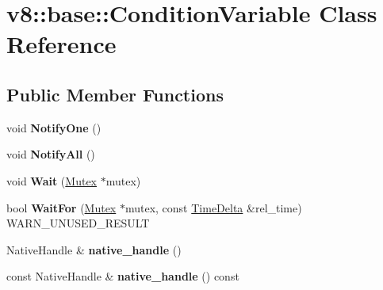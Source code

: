 \hypertarget{classv8_1_1base_1_1_condition_variable}{}\section{v8\+:\+:base\+:\+:Condition\+Variable Class Reference}
\label{classv8_1_1base_1_1_condition_variable}
\subsection*{Public Member Functions}
\begin{DoxyCompactItemize}
\item 
void {\bfseries Notify\+One} ()\hypertarget{classv8_1_1base_1_1_condition_variable_ab95e3ebf6594803215e1fea18848eb97}{}\label{classv8_1_1base_1_1_condition_variable_ab95e3ebf6594803215e1fea18848eb97}

\item 
void {\bfseries Notify\+All} ()\hypertarget{classv8_1_1base_1_1_condition_variable_a28caf62e21af81a016735dd9f11010d0}{}\label{classv8_1_1base_1_1_condition_variable_a28caf62e21af81a016735dd9f11010d0}

\item 
void {\bfseries Wait} (\hyperlink{classv8_1_1base_1_1_mutex}{Mutex} $\ast$mutex)\hypertarget{classv8_1_1base_1_1_condition_variable_a29ca064849ef418937bbedcb0900279c}{}\label{classv8_1_1base_1_1_condition_variable_a29ca064849ef418937bbedcb0900279c}

\item 
bool {\bfseries Wait\+For} (\hyperlink{classv8_1_1base_1_1_mutex}{Mutex} $\ast$mutex, const \hyperlink{classv8_1_1base_1_1_time_delta}{Time\+Delta} \&rel\+\_\+time) W\+A\+R\+N\+\_\+\+U\+N\+U\+S\+E\+D\+\_\+\+R\+E\+S\+U\+LT\hypertarget{classv8_1_1base_1_1_condition_variable_a3d86e3f3c57db0db9f2f731cee818bab}{}\label{classv8_1_1base_1_1_condition_variable_a3d86e3f3c57db0db9f2f731cee818bab}

\item 
Native\+Handle \& {\bfseries native\+\_\+handle} ()\hypertarget{classv8_1_1base_1_1_condition_variable_a372a5320ae4680df03af34cf6e605f69}{}\label{classv8_1_1base_1_1_condition_variable_a372a5320ae4680df03af34cf6e605f69}

\item 
const Native\+Handle \& {\bfseries native\+\_\+handle} () const \hypertarget{classv8_1_1base_1_1_condition_variable_ac6ac8b1ae120b3788113e41931482ac9}{}\label{classv8_1_1base_1_1_condition_variable_ac6ac8b1ae120b3788113e41931482ac9}

\end{DoxyCompactItemize}
